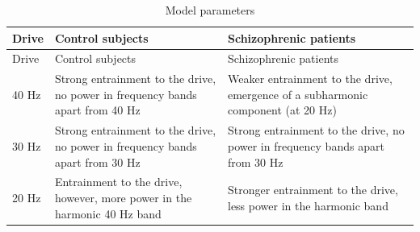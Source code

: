 \documentclass[10pt,a4paper,onecolumn]{article}
\begin{document}
\begin{longtable}[]{@{}lll@{}}
\caption{Model parameters}\label{tbl:mainresults}\tabularnewline
\toprule
\begin{minipage}[b]{0.08\columnwidth}\raggedright\strut
Drive\strut
\end{minipage} & \begin{minipage}[b]{0.41\columnwidth}\raggedright\strut
Control subjects\strut
\end{minipage} & \begin{minipage}[b]{0.42\columnwidth}\raggedright\strut
Schizophrenic patients\strut
\end{minipage}\tabularnewline
\midrule
\endfirsthead
\toprule
\begin{minipage}[b]{0.08\columnwidth}\raggedright\strut
Drive\strut
\end{minipage} & \begin{minipage}[b]{0.41\columnwidth}\raggedright\strut
Control subjects\strut
\end{minipage} & \begin{minipage}[b]{0.42\columnwidth}\raggedright\strut
Schizophrenic patients\strut
\end{minipage}\tabularnewline
\midrule
\endhead
\begin{minipage}[t]{0.08\columnwidth}\raggedright\strut
40 Hz\strut
\end{minipage} & \begin{minipage}[t]{0.41\columnwidth}\raggedright\strut
Strong entrainment to the drive, no power in frequency bands apart from
40 Hz\strut
\end{minipage} & \begin{minipage}[t]{0.42\columnwidth}\raggedright\strut
Weaker entrainment to the drive, emergence of a subharmonic component
(at 20 Hz)\strut
\end{minipage}\tabularnewline
\begin{minipage}[t]{0.08\columnwidth}\raggedright\strut
30 Hz\strut
\end{minipage} & \begin{minipage}[t]{0.41\columnwidth}\raggedright\strut
Strong entrainment to the drive, no power in frequency bands apart from
30 Hz\strut
\end{minipage} & \begin{minipage}[t]{0.42\columnwidth}\raggedright\strut
Strong entrainment to the drive, no power in frequency bands apart from
30 Hz\strut
\end{minipage}\tabularnewline
\begin{minipage}[t]{0.08\columnwidth}\raggedright\strut
20 Hz\strut
\end{minipage} & \begin{minipage}[t]{0.41\columnwidth}\raggedright\strut
Entrainment to the drive, however, more power in the harmonic 40 Hz
band\strut
\end{minipage} & \begin{minipage}[t]{0.42\columnwidth}\raggedright\strut
Stronger entrainment to the drive, less power in the harmonic band\strut
\end{minipage}\tabularnewline
\bottomrule
\end{longtable}
\end{document}
